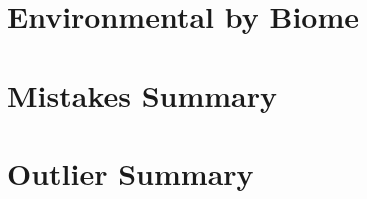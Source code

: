 \documentclass[11pt,a4paper]{article}
\begin{document}
\section{Environmental by Biome}
\begin{table}[htbp]\centering\resizebox{\textwidth}{!}{}\end{table}

\section{Mistakes Summary}
\begin{table}[htbp]\centering\resizebox{\textwidth}{!}{}\end{table}

\section{Outlier Summary}
\begin{table}[htbp]\centering\resizebox{\textwidth}{!}{}\end{table}
\end{document}
